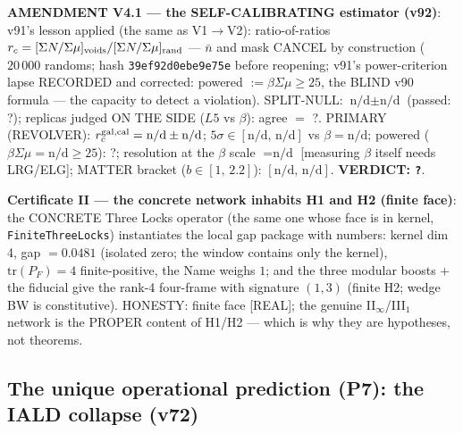 \documentclass[11pt]{article}
\theoremstyle{definition}\newtheorem{deriv}{Derivation}
\begin{document}
\textbf{AMENDMENT V4.1 --- the SELF-CALIBRATING estimator (v92)}: v91's lesson applied (the same as V1$\to$V2): ratio-of-ratios $r_c=[\Sigma N/\Sigma\mu]_{\rm voids}/[\Sigma N/\Sigma\mu]_{\rm rand}$ --- $\bar n$ and mask CANCEL by construction ($20\,000$ randoms; hash \texttt{39ef92d0ebe9e75e} before reopening; v91's power-criterion lapse RECORDED and corrected: powered $:=\beta\Sigma\mu\ge25$, the BLIND v90 formula --- the capacity to detect a violation). SPLIT-NULL: $\text{n/d}\pm\text{n/d}$ (passed: ?); replicas judged ON THE SIDE ($L5$ vs $\beta$): agree $=$ ?. PRIMARY (REVOLVER): $r_c^{\rm gal,cal}=\text{n/d}\pm\text{n/d}$; $5\sigma\in[\text{n/d},\,\text{n/d}]$ vs $\beta=\text{n/d}$; powered ($\beta\Sigma\mu=\text{n/d}\ge25$): ?; resolution at the $\beta$ scale $=\text{n/d}$ [measuring $\beta$ itself needs LRG/ELG]; MATTER bracket ($b\in[1,\,2.2]$): $[\text{n/d},\,\text{n/d}]$. \textbf{VERDICT: \texttt{?}}.

\textbf{Certificate II --- the concrete network inhabits H1 and H2 (finite face)}: the CONCRETE Three Locks operator (the same one whose face is in kernel, \texttt{FiniteThreeLocks}) instantiates the local gap package with numbers: kernel dim 4, gap $=0.0481$ (isolated zero; the window contains only the kernel), $\mathrm{tr}(P_F)=4$ finite-positive, the Name weighs $1$; and the three modular boosts $+$ the fiducial give the rank-4 four-frame with signature $(1,3)$ (finite H2; wedge BW is constitutive). HONESTY: finite face [REAL]; the genuine II$_\infty$/III$_1$ network is the PROPER content of H1/H2 --- which is why they are hypotheses, not theorems.

\subsection*{The unique operational prediction (P7): the IALD collapse (v72)}
\end{document}

